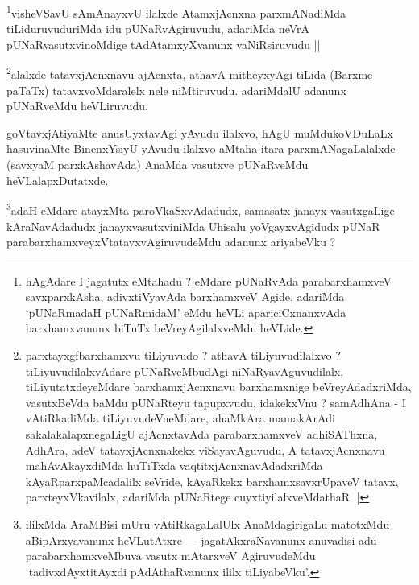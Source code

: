 \begin{artha}
\footnote{hAgAdare I jagatutx eMtahadu ? eMdare pUNaRvAda parabarxhamxveV savxparxkAsha, adivxtiVyavAda barxhamxveV Agide, adariMda `pUNaRmadaH pUNaRmidaM' eMdu heVLi apariciCxnanxvAda barxhamxvanunx biTuTx beVreyAgilalxveMdu heVLide.}visheVSavU sAmAnayxvU ilalxde AtamxjAcnxna parxmANadiMda tiLiduruvuduriMda idu pUNaRvAgiruvudu, adariMda neVrA pUNaRvasutxvinoMdige tAdAtamxyXvanunx vaNiRsiruvudu ||
\end{artha}


\begin{artha}
\footnote{parxtayxgfbarxhamxvu tiLiyuvudo ? athavA tiLiyuvudilalxvo ? tiLiyuvudilalxvAdare pUNaRveMbudAgi niNaRyavAguvudilalx, tiLiyutatxdeyeMdare barxhamxjAcnxnavu barxhamxnige beVreyAdadxriMda, vasutxBeVda baMdu pUNaRteyu tapupxvudu, idakekxVnu ? samAdhAna - I vAtiRkadiMda tiLiyuvudeVneMdare, ahaMkAra mamakArAdi sakalakalapxnegaLigU ajAcnxtavAda parabarxhamxveV adhiSAThxna, AdhAra, adeV tatavxjAcnxnakekx viSayavAguvudu, A tatavxjAcnxnavu mahAvAkayxdiMda huTiTxda vaqtitxjAcnxnavAdadxriMda kAyaRparxpaMcadalilx seVride, kAyaRkekx barxhamxsavxrUpaveV tatavx, parxteyxVkavilalx, adariMda pUNaRtege cuyxtiyilalxveMdathaR ||}alalxde tatavxjAcnxnavu ajAcnxta, athavA mitheyxyAgi tiLida (Barxme paTaTx) tatavxvoMdaralelx nele niMtiruvudu. adariMdalU adanunx pUNaRveMdu heVLiruvudu.
\end{artha}


\begin{artha}
goVtavxjAtiyaMte anusUyxtavAgi yAvudu ilalxvo, hAgU muMdukoVDuLaLx hasuvinaMte BinenxYsiyU yAvudu ilalxvo aMtaha itara parxmANagaLalalxde (savxyaM parxkAshavAda) AnaMda vasutxve pUNaRveMdu heVLalapxDutatxde.
\end{artha}


\begin{artha}
\footnote{ililxMda AraMBisi mUru vAtiRkagaLalUlx AnaMdagirigaLu matotxMdu aBipArxyavanunx heVLutAtxre --- jagatAkxraNavanunx anuvadisi adu parabarxhamxveMbuva vasutx mAtarxveV AgiruvudeMdu `tadivxdAyxtitAyxdi pAdAthaRvanunx ililx tiLiyabeVku'.}adaH eMdare atayxMta paroVkaSxvAdadudx, samasatx janayx vasutxgaLige kAraNavAdadudx janayxvasutxviniMda Uhisalu yoVgayxvAgidudx pUNaR parabarxhamxveyxVtatavxvAgiruvudeMdu adanunx ariyabeVku ?
\end{artha}

